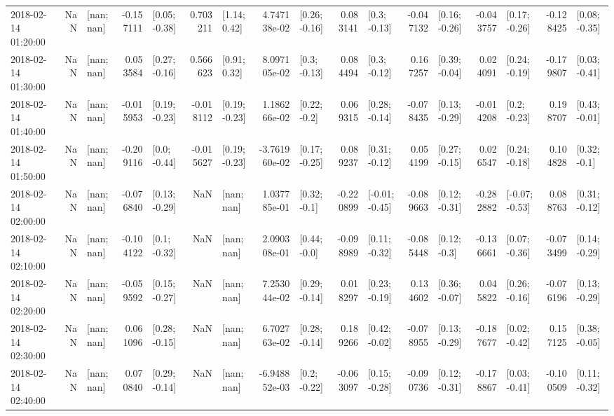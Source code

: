 \begin{tabular}{lrlrlrlrlrlrlrlrl}
2018-02-14 01:20:00 &       NaN &      [nan; nan] & -0.157111 &   [0.05; -0.38] &  0.703211 &    [1.14; 0.42] &  4.747138e-02 &   [0.26; -0.16] &  0.083141 &    [0.3; -0.13] & -0.047132 &   [0.16; -0.26] & -0.043757 &   [0.17; -0.26] & -0.128425 &   [0.08; -0.35] \\
2018-02-14 01:30:00 &       NaN &      [nan; nan] &  0.053584 &   [0.27; -0.16] &  0.566623 &    [0.91; 0.32] &  8.097105e-02 &    [0.3; -0.13] &  0.084494 &    [0.3; -0.12] &  0.167257 &   [0.39; -0.04] &  0.024091 &   [0.24; -0.19] & -0.179807 &   [0.03; -0.41] \\
2018-02-14 01:40:00 &       NaN &      [nan; nan] & -0.015953 &   [0.19; -0.23] & -0.018112 &   [0.19; -0.23] &  1.186266e-02 &    [0.22; -0.2] &  0.069315 &   [0.28; -0.14] & -0.078435 &   [0.13; -0.29] & -0.014208 &    [0.2; -0.23] &  0.198707 &   [0.43; -0.01] \\
2018-02-14 01:50:00 &       NaN &      [nan; nan] & -0.209116 &    [0.0; -0.44] & -0.015627 &   [0.19; -0.23] & -3.761960e-02 &   [0.17; -0.25] &  0.089237 &   [0.31; -0.12] &  0.054199 &   [0.27; -0.15] &  0.026547 &   [0.24; -0.18] &  0.104828 &    [0.32; -0.1] \\
2018-02-14 02:00:00 &       NaN &      [nan; nan] & -0.076840 &   [0.13; -0.29] &       NaN &      [nan; nan] &  1.037785e-01 &    [0.32; -0.1] & -0.220899 &  [-0.01; -0.45] & -0.089663 &   [0.12; -0.31] & -0.282882 &  [-0.07; -0.53] &  0.088763 &   [0.31; -0.12] \\
2018-02-14 02:10:00 &       NaN &      [nan; nan] & -0.104122 &    [0.1; -0.32] &       NaN &      [nan; nan] &  2.090308e-01 &    [0.44; -0.0] & -0.098989 &   [0.11; -0.32] & -0.085448 &    [0.12; -0.3] & -0.136661 &   [0.07; -0.36] & -0.073499 &   [0.14; -0.29] \\
2018-02-14 02:20:00 &       NaN &      [nan; nan] & -0.059592 &   [0.15; -0.27] &       NaN &      [nan; nan] &  7.253044e-02 &   [0.29; -0.14] &  0.018297 &   [0.23; -0.19] &  0.134602 &   [0.36; -0.07] &  0.045822 &   [0.26; -0.16] & -0.076196 &   [0.13; -0.29] \\
2018-02-14 02:30:00 &       NaN &      [nan; nan] &  0.061096 &   [0.28; -0.15] &       NaN &      [nan; nan] &  6.702763e-02 &   [0.28; -0.14] &  0.189266 &   [0.42; -0.02] & -0.078955 &   [0.13; -0.29] & -0.187677 &   [0.02; -0.42] &  0.157125 &   [0.38; -0.05] \\
2018-02-14 02:40:00 &       NaN &      [nan; nan] &  0.070840 &   [0.29; -0.14] &       NaN &      [nan; nan] & -6.948852e-03 &    [0.2; -0.22] & -0.063097 &   [0.15; -0.28] & -0.090736 &   [0.12; -0.31] & -0.178867 &   [0.03; -0.41] & -0.100509 &   [0.11; -0.32] \\

\end{tabular}
